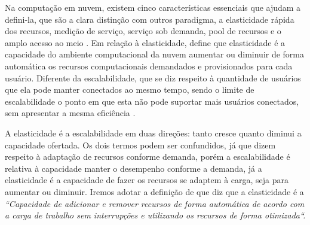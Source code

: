 \documentclass[twoside,english,brazilian]{UNISINOSartigo}
\begin{document}
Na computação em nuvem, existem cinco características essenciais que ajudam a defini-la, que são a clara distinção com outros paradigma, a elasticidade rápida dos recursos, medição de serviço, serviço sob demanda, pool de recursos e o amplo acesso ao meio \cite{Moreira2010}. Em relação à elasticidade,  define que elasticidade é a capacidade do ambiente computacional da nuvem aumentar ou diminuir de forma automática os recursos computacionais demandados e provisionados para cada usuário. Diferente da escalabilidade, que se diz respeito à quantidade de usuários que ela pode manter conectados ao mesmo tempo, sendo o limite de escalabilidade o ponto em que esta não pode suportar mais usuários conectados, sem apresentar a mesma  eficiência \cite{Wilder12}. 

A elasticidade é a escalabilidade em duas direções: tanto cresce quanto diminui a capacidade ofertada. Os dois termos podem ser confundidos, já que dizem respeito à adaptação de recursos conforme demanda, porém a escalabilidade é relativa à capacidade manter o desempenho conforme a demanda, já a elasticidade é a capacidade de fazer os recursos se adaptem à carga, seja para aumentar ou diminuir. 
Iremos adotar a definição de  que diz que a elasticidade é a \textit{``Capacidade de adicionar e remover recursos de forma automática de acordo com a carga de trabalho sem interrupções e utilizando os recursos de forma otimizada``.}
\end{document}
